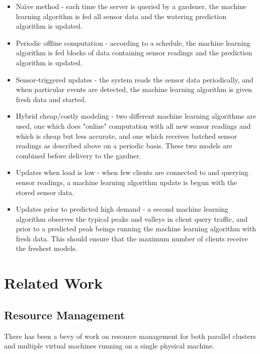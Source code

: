 \documentclass[a4paper]{acm_proc_article-sp}
\begin{document}
\begin{itemize}

\item Na\"{\i}ve method - each time the server is queried by a gardener, the machine learning algorithm is fed all sensor data and the watering prediction algorithm is updated.

\item Periodic offline computation - according to a schedule, the machine learning algorithm is fed blocks of data containing sensor readings and the prediction algorithm is updated.

\item Sensor-triggered updates - the system reads the sensor data periodically, and when particular events are detected, the machine learning algorithm is given fresh data and started.

\item Hybrid cheap/costly modeling - two different machine learning algorithms are used, one which does "online" computation with all new sensor readings and which is cheap but less accurate, and one which receives batched sensor readings as described above on a periodic basis.  These two models are combined before delivery to the gardner.

\item Updates when load is low - when few clients are connected to and querying sensor readings, a machine learning algorithm update is begun with the stored sensor data.

\item Updates prior to predicted high demand - a second machine learning algorithm observes the typical peaks and valleys in client query traffic, and prior to a predicted peak beings running the machine learning algorithm with fresh data.  This should ensure that the maximum number of clients receive the freshest models.

\end{itemize}

\section{Related Work}

\subsection{Resource Management}

There has been a bevy of work on resource management for both parallel clusters and multiple virtual machines running on a single physical machine.
\end{document}

